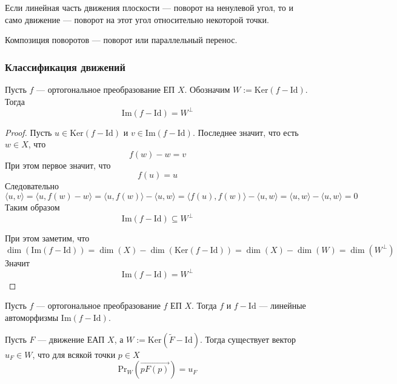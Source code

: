 \documentclass[12pt,a4paper]{article}
\newcommand{\Id}{\ensuremath{\mathrm{Id}}\xspace}
\newcommand{\Ker}{\ensuremath{\mathrm{Ker}}\xspace}
\newcommand{\Img}{\ensuremath{\mathrm{Im}}\xspace}
\renewcommand{\Pr}{\ensuremath{\mathrm{Pr}}\xspace}
\begin{document}
    \begin{corollary}
        Если линейная часть движения плоскости --- поворот на ненулевой угол, то и само движение --- поворот на этот угол относительно некоторой точки.
    \end{corollary}

    \begin{corollary}
        Композиция поворотов --- поворот или параллельный перенос.
    \end{corollary}

    \subsubsection{Классификация движений}

    \begin{lemma}
        Пусть $f$ --- ортогональное преобразование ЕП $X$. Обозначим $W := \Ker(f - \Id)$. Тогда
        \[\Img(f - \Id) = W^\perp\]
    \end{lemma}

    \begin{proof}
        Пусть $u \in \Ker(f - \Id)$ и $v \in \Img(f - \Id)$. Последнее значит, что есть $w \in X$, что
        \[f(w) - w = v\]
        При этом первое значит, что
        \[f(u) = u\]
        Следовательно
        \[
            \langle u, v \rangle
            = \langle u, f(w) - w \rangle
            = \langle u, f(w) \rangle - \langle u, w \rangle
            = \langle f(u), f(w) \rangle - \langle u, w \rangle
            = \langle u, w \rangle - \langle u, w \rangle
            = 0
        \]
        Таким образом
        \[\Img(f - \Id) \subseteq W^\perp\]

        При этом заметим, что
        \[
            \dim(\Img(f - \Id))
            = \dim(X) - \dim(\Ker(f - \Id))
            = \dim(X) - \dim(W)
            = \dim(W^\perp)
        \]
        Значит
        \[\Img(f - \Id) = W^\perp\]
    \end{proof}

    \begin{corollary}
        Пусть $f$ --- ортогональное преобразование $f$ ЕП $X$. Тогда $f$ и $f - \Id$ --- линейные автоморфизмы $\Img(f - \Id)$.
    \end{corollary}

    \begin{lemma}
        Пусть $F$ --- движение ЕАП $X$, а $W := \Ker(\widetilde{F} - \Id)$. Тогда существует вектор $u_F \in W$, что для всякой точки $p \in X$
        \[\Pr_W(\overrightarrow{p F(p)}) = u_F\]
    \end{lemma}
\end{document}
